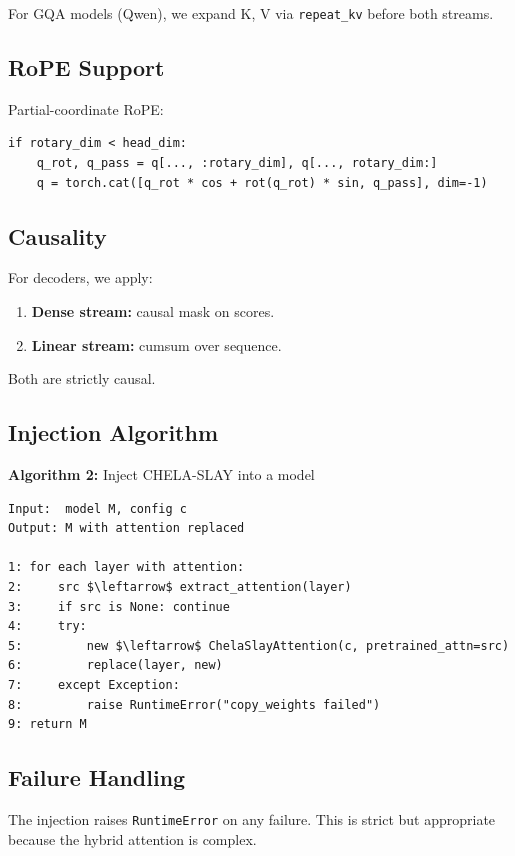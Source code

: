 For GQA models (Qwen), we expand K, V via \texttt{repeat\_kv} before both streams.

\subsection{RoPE Support}

Partial-coordinate RoPE:

\begin{lstlisting}
if rotary_dim < head_dim:
    q_rot, q_pass = q[..., :rotary_dim], q[..., rotary_dim:]
    q = torch.cat([q_rot * cos + rot(q_rot) * sin, q_pass], dim=-1)
\end{lstlisting}

\subsection{Causality}

For decoders, we apply:

\begin{enumerate}
\item \textbf{Dense stream:} causal mask on scores.
\item \textbf{Linear stream:} cumsum over sequence.

\end{enumerate}
Both are strictly causal.

\subsection{Injection Algorithm}

\textbf{Algorithm 2:} Inject CHELA-SLAY into a model
\begin{lstlisting}
Input:  model M, config c
Output: M with attention replaced

1: for each layer with attention:
2:     src $\leftarrow$ extract_attention(layer)
3:     if src is None: continue
4:     try:
5:         new $\leftarrow$ ChelaSlayAttention(c, pretrained_attn=src)
6:         replace(layer, new)
7:     except Exception:
8:         raise RuntimeError("copy_weights failed")
9: return M
\end{lstlisting}

\subsection{Failure Handling}

The injection raises \texttt{RuntimeError} on any failure. This is strict but 
appropriate because the hybrid attention is complex.

